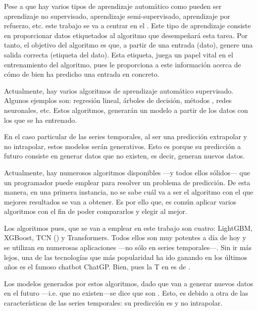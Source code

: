 Pese a que hay varios tipos de aprendizaje automático como pueden ser aprendizaje no supervisado, aprendizaje semi-supervisado, aprendizaje por refuerzo, etc. este trabajo se va a centrar en el . Este tipo de aprendizaje consiste en proporcionar datos etiquetados al algoritmo que desempeñará esta tarea. Por tanto, el objetivo del algoritmo es que, a partir de una entrada (dato), genere una salida correcta (etiqueta del dato). Esta etiqueta, juega un papel vital en el entrenamiento del algoritmo, pues le proporciona a este información acerca de cómo de bien ha predicho una entrada en concreto.

Actualmente, hay varios algoritmos de aprendizaje automático supervisado. Algunos ejemplos son: regresión lineal, árboles de decisión, métodos , redes neuronales, etc. Estos algoritmos, generarán un modelo a partir de los datos con los que se ha entrenado. 

En el caso particular de las series temporales, al ser una predicción extrapolar y no intrapolar, estos modelos serán generativos. Esto es porque su predicción a futuro consiste en generar datos que no existen, es decir, generan nuevos datos.

Actualmente, hay numerosos algoritmos disponibles ---y todos ellos sólidos--- que un programador puede emplear para resolver un problema de predicción. De esta manera, en una primera instancia, no se sabe cuál va a ser el algoritmo con el que mejores resultados se van a obtener. Es por ello que, es común aplicar varios algoritmos con el fin de poder compararlos y elegir al mejor. 

Los algoritmos pues, que se van a emplear en este trabajo son cuatro: LightGBM, XGBoost, TCN () y Transformers. Todos ellos son muy potentes a día de hoy y se utilizan en numerosas aplicaciones ---no sólo en series temporales---. Sin ir más lejos, una de las tecnologías que más popularidad ha ido ganando en los últimos años es el famoso chatbot ChatGP. Bien, pues la T en  es de .

Los modelos generados por estos algoritmos, dado que van a generar nuevos datos en el futuro ---i.e. que no existen---se dice que son . Esto, es debido a otra de las características de las series temporales: su predicción es  y no intrapolar\fnm.
 

